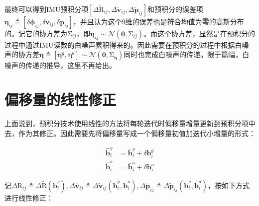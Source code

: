 最终可以得到IMU预积分项$[\Delta\tilde{\mathrm R}_{ij},\Delta\tilde{\mathbf v}_{ij},\Delta\tilde{\mathbf p}_{ij}]$和预积分的误差项$\bm\eta_{ij} \triangleq \left[\delta\bm\phi_{ij},\delta\mathbf{v}_{ij},\delta\mathbf{p}_{ij}\right]$，并且认为这个$9$维的误差也是符合均值为零的高斯分布的。记它的协方差为$\mathrm{\Sigma}_{ij}$，即$\bm\eta_{ij} \sim \mathcal{N}\left(\mathbf{0},\mathrm{\Sigma}_{ij}\right)$。而这个协方差，显然是在预积分的过程中通过IMU读数的白噪声累积得来的。因此需要在预积分的过程中根据白噪声的协方差$\bm\eta \triangleq \left[\bm\eta^g,\bm\eta^a\right] \sim \mathcal{N}(\mathbf{0},\mathrm\Sigma_{\bm\eta})$同时也完成白噪声的传递。限于篇幅，白噪声的传递的推导，这里不再给出。

\section{偏移量的线性修正}

上面说到，预积分技术使用线性的方法将每轮迭代时偏移量增量更新到预积分项中去，作为其修正。因此需要先将偏移量写成一个偏移量初值加迭代小增量的形式：

\begin{equation}
\begin{aligned}
    \hat{\mathbf b}^g_i &= \bar{\mathbf b}^g_i + \delta\mathbf{b}^g_i \\
    \hat{\mathbf b}^a_i &= \bar{\mathbf b}^a_i + \delta\mathbf{b}^a_i
\end{aligned}
\end{equation}

记$\Delta\bar{\mathrm R}_{ij}\triangleq\Delta\tilde{\mathrm R}(\bar{\mathbf b}^g_i), \Delta\bar{\mathbf v}_{ij}\triangleq\Delta\tilde{\mathbf v}_{ij}(\bar{\mathbf b}^g_i,\bar{\mathbf b}^a_i), \Delta\bar{\mathbf p}_{ij}\triangleq\Delta\tilde{\mathbf p}_{ij}(\bar{\mathbf b}^g_i,\bar{\mathbf b}^a_i)$，按如下方式进行线性修正：

